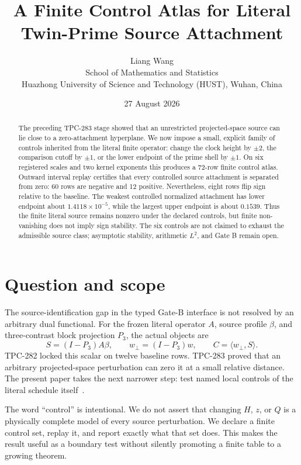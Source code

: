 \documentclass[11pt]{article}
\title{A Finite Control Atlas for Literal Twin-Prime Source Attachment}
\author{Liang Wang\\
School of Mathematics and Statistics\\
Huazhong University of Science and Technology (HUST), Wuhan, China}
\date{27 August 2026}
\begin{document}
\maketitle

\begin{abstract}
The preceding TPC-283 stage showed that an unrestricted projected-space
source can lie close to a zero-attachment hyperplane.  We now impose a small,
explicit family of controls inherited from the literal finite operator: change
the clock height by $\pm2$, the comparison cutoff by $\pm1$, or the lower
endpoint of the prime shell by $\pm1$.  On six registered scales and two
kernel exponents this produces a 72-row finite control atlas.  Outward
interval replay certifies that every controlled source attachment is separated
from zero: 60 rows are negative and 12 positive.  Nevertheless, eight rows
flip sign relative to the baseline.  The weakest controlled normalized
attachment has lower endpoint about $1.4118\times10^{-5}$, while the largest
upper endpoint is about $0.1539$.  Thus the finite literal source remains
nonzero under the declared controls, but finite non-vanishing does not imply
sign stability.  The six controls are not claimed to exhaust the admissible
source class; asymptotic stability, arithmetic $L^2$, and Gate B remain open.
\end{abstract}

\section{Question and scope}

The source-identification gap in the typed Gate-B interface is not resolved by
an arbitrary dual functional.  For the frozen literal operator $A$, source
profile $\beta$, and three-contrast block projection $P_3$, the actual objects
are
\begin{equation}
 S=(I-P_3)A\beta,\qquad w_\perp=(I-P_3)w,
 \qquad C=\langle w_\perp,S\rangle .
 \label{eq:attachment}
\end{equation}
TPC-282 locked this scalar on twelve baseline rows.  TPC-283 proved that an
arbitrary projected-space perturbation can zero it at a small relative
distance.  The present paper takes the next narrower step: test named local
controls of the literal schedule itself~\cite{tpc283,tpc268}.

The word ``control'' is intentional.  We do not assert that changing $H$,
$z$, or $Q$ is a physically complete model of every source perturbation.  We
declare a finite control set, replay it, and report exactly what that set does.
This makes the result useful as a boundary test without silently promoting a
finite table to a growing theorem.
\end{document}
